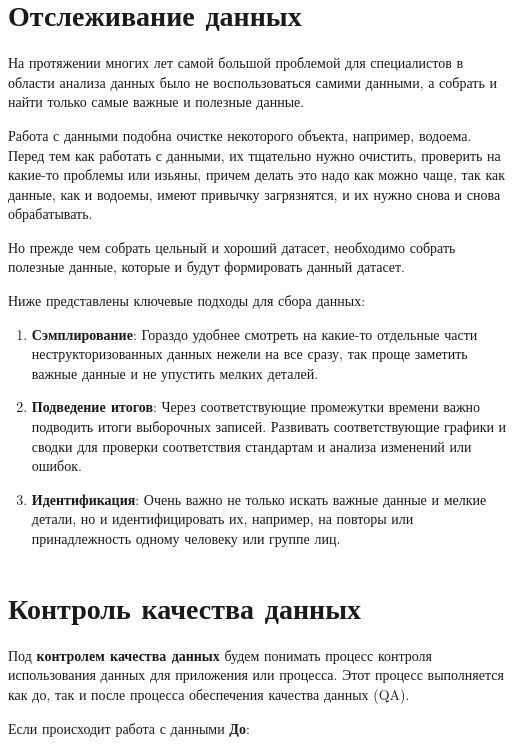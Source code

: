 \documentclass{article}
\begin{document}
\newpage

\section{Отслеживание данных}

На протяжении многих лет самой большой проблемой для специалистов в области анализа данных было не воспользоваться самими данными, а собрать и найти только самые важные и полезные данные. 

Работа с данными подобна очистке некоторого объекта, например, водоема. Перед тем как работать с данными, их тщательно нужно очистить, проверить на какие-то проблемы или изьяны, причем делать это надо как можно чаще, так как данные, как и водоемы, имеют привычку загрязнятся, и их нужно снова и снова обрабатывать.

Но прежде чем собрать цельный и хороший датасет, необходимо собрать полезные данные, которые и будут формировать данный датасет.

Ниже представлены ключевые подходы для сбора данных:

\begin{enumerate}
    \item \textbf{Сэмплирование}: Гораздо удобнее смотреть на какие-то отдельные части неструкторизованных данных нежели на все сразу, так проще заметить важные данные и не упустить мелких деталей.
    \item \textbf{Подведение итогов}: Через соответствующие промежутки времени важно подводить итоги выборочных записей. Развивать соответствующие графики и сводки для проверки соответствия стандартам и анализа изменений или ошибок.
    \item \textbf{Идентификация}: Очень важно не только искать важные данные и мелкие детали, но и идентифицировать их, например, на повторы или принадлежность одному человеку или группе лиц.
\end{enumerate}

\section{Контроль качества данных}

Под \textbf{контролем качества данных} будем понимать процесс контроля использования данных для приложения или процесса. Этот процесс выполняется как до, так и после процесса обеспечения качества данных (QA).

Если происходит работа с данными \textbf{До}:
\end{document}

